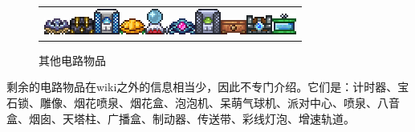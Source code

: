 \begin{figure}[!htp]
{\begin{tabular}[b]{c}
\includegraphics{figures/Music_Box_(Goblin_Invasion).png}\quad\includegraphics{figures/Music_Box_(Pirate_Invasion).png}\quad\includegraphics{figures/Music_Box_(Martian_Madness).png}\quad\includegraphics{figures/Music_Box_(Pumpkin_Moon).png}\quad\includegraphics{figures/Music_Box_(Frost_Moon).png}\quad\includegraphics{figures/Music_Box_(The_Towers).png}\quad\includegraphics{figures/Music_Box_(Lunar_Boss).png}\quad\includegraphics{figures/Music_Box_(Sandstorm).png}\quad\includegraphics{figures/Music_Box_(Old_Ones_Army).png}\quad\includegraphics{figures/Music_Box_(Title).png}
\end{tabular}}%
\caption{其他电路物品}
\end{figure}
剩余的电路物品在wiki之外的信息相当少，因此不专门介绍。它们是：计时器、宝石锁、雕像、烟花喷泉、烟花盒、泡泡机、呆萌气球机、派对中心、喷泉、八音盒、烟囱、天塔柱、广播盒、制动器、传送带、彩线灯泡、增速轨道。